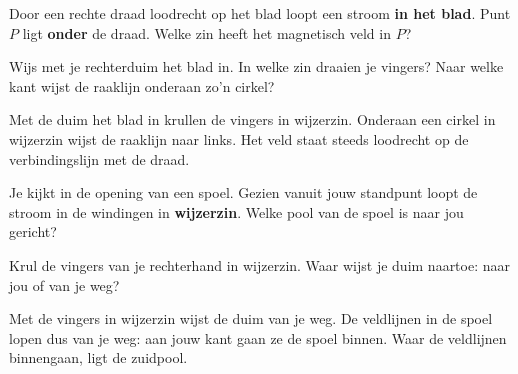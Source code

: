 \documentclass{ximera}
\begin{document}
\begin{question}
    Door een rechte draad loodrecht op het blad loopt een stroom \textbf{in het blad}. Punt $P$ ligt \textbf{onder} de draad. Welke zin heeft het magnetisch veld in $P$?

    \begin{center}
    \end{center}

    \begin{multipleChoice}
    \end{multipleChoice}

    \begin{hint}
        Wijs met je rechterduim het blad in. In welke zin draaien je vingers? Naar welke kant wijst de raaklijn onderaan zo'n cirkel?
    \end{hint}

    \begin{solution}\nl
        Met de duim het blad in krullen de vingers in wijzerzin. Onderaan een cirkel in wijzerzin wijst de raaklijn naar links. Het veld staat steeds loodrecht op de verbindingslijn met de draad.
    \end{solution}
\end{question}

\begin{question}
    Je kijkt in de opening van een spoel. Gezien vanuit jouw standpunt loopt de stroom in de windingen in \textbf{wijzerzin}. Welke pool van de spoel is naar jou gericht?

    \begin{multipleChoice}
    \end{multipleChoice}

    \begin{hint}
        Krul de vingers van je rechterhand in wijzerzin. Waar wijst je duim naartoe: naar jou of van je weg?
    \end{hint}

    \begin{solution}\nl
        Met de vingers in wijzerzin wijst de duim van je weg. De veldlijnen in de spoel lopen dus van je weg: aan jouw kant gaan ze de spoel binnen. Waar de veldlijnen binnengaan, ligt de zuidpool.
    \end{solution}
\end{question}
\end{document}
